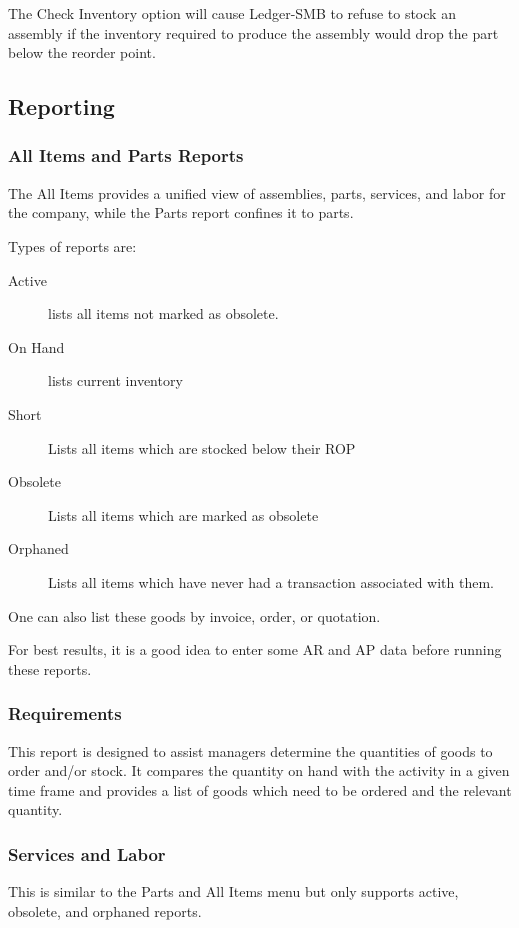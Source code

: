 \documentclass{article}
\begin{document}
The Check Inventory option will cause Ledger-SMB to refuse to stock an assembly
if the inventory required to produce the assembly would drop the part below the
reorder point.

\subsection{Reporting}
\subsubsection{All Items and Parts Reports}

The All Items provides a unified view of assemblies, parts, services, and labor
for the company, while the Parts report confines it to parts.

Types of reports are:
\begin{description}
\item[Active] lists all items not marked as obsolete.
\item[On Hand] lists current inventory
\item[Short] Lists all items which are stocked below their ROP
\item[Obsolete] Lists all items which are marked as obsolete
\item[Orphaned] Lists all items which have never had a transaction associated
with them.
\end{description}

One can also list these goods by invoice, order, or quotation.

For best results, it is a good idea to enter some AR and AP data before running
these reports.

\subsubsection{Requirements}

This report is designed to assist managers determine the quantities of goods to
order and/or stock.  It compares the quantity on hand with the activity in a
given time frame and provides a list of goods which need to be ordered and the
relevant quantity.

\subsubsection{Services and Labor}
This is similar to the Parts and All Items menu but only supports active,
obsolete, and orphaned reports.
\end{document}

